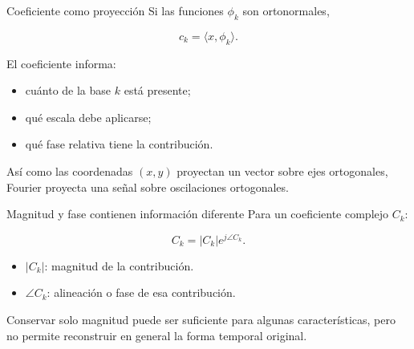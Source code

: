 \documentclass[
  ignorenonframetext,
  aspectratio=169,
  spanish,
  professionalfonts]{beamer}
\providecommand{\tightlist}{%
  \setlength{\itemsep}{0pt}\setlength{\parskip}{0pt}}
\begin{document}
\begin{frame}{Coeficiente como proyección}
\protect{}\label{coeficiente-como-proyecciuxf3n}
Si las funciones \(\phi_k\) son ortonormales,

\[
c_k=\langle x,\phi_k\rangle.
\]

El coeficiente informa:

\begin{itemize}
\tightlist
\item
  cuánto de la base \(k\) está presente;
\item
  qué escala debe aplicarse;
\item
  qué fase relativa tiene la contribución.
\end{itemize}

\begin{tcolorbox}[enhanced jigsaw, arc=.35mm, bottomrule=.15mm, bottomtitle=1mm, breakable, colback=white, colbacktitle=quarto-callout-tip-color!10!white, colframe=quarto-callout-tip-color-frame, coltitle=black, left=2mm, leftrule=.75mm, opacityback=0, opacitybacktitle=0.6, rightrule=.15mm, title={Analogía}, titlerule=0mm, toprule=.15mm, toptitle=1mm]

Así como las coordenadas \((x,y)\) proyectan un vector sobre ejes
ortogonales, Fourier proyecta una señal sobre oscilaciones ortogonales.

\end{tcolorbox}
\end{frame}

\begin{frame}{Magnitud y fase contienen información diferente}
\protect{}\label{magnitud-y-fase-contienen-informaciuxf3n-diferente}
Para un coeficiente complejo \(C_k\):

\[
C_k=|C_k|e^{j\angle C_k}.
\]

\begin{itemize}
\tightlist
\item
  \(|C_k|\): magnitud de la contribución.
\item
  \(\angle C_k\): alineación o fase de esa contribución.
\end{itemize}

\begin{tcolorbox}[enhanced jigsaw, arc=.35mm, bottomrule=.15mm, bottomtitle=1mm, breakable, colback=white, colbacktitle=quarto-callout-warning-color!10!white, colframe=quarto-callout-warning-color-frame, coltitle=black, left=2mm, leftrule=.75mm, opacityback=0, opacitybacktitle=0.6, rightrule=.15mm, title={Error frecuente}, titlerule=0mm, toprule=.15mm, toptitle=1mm]

Conservar solo magnitud puede ser suficiente para algunas
características, pero no permite reconstruir en general la forma
temporal original.

\end{tcolorbox}
\end{frame}
\end{document}
